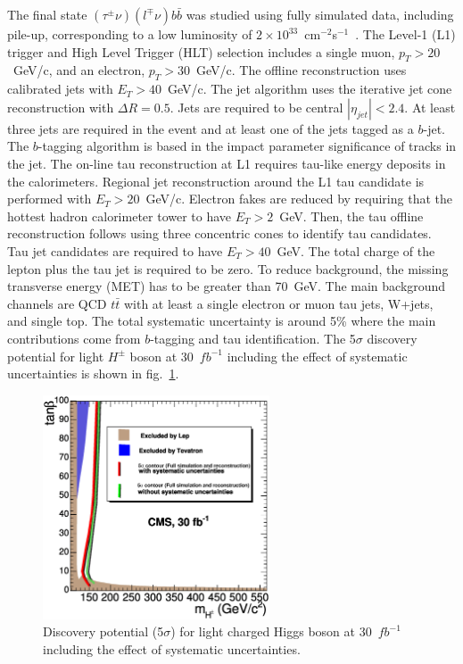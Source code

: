 \documentclass{cimento}
\begin{document}
The final state $(\tau^{\pm}\nu)(l^{\mp}\nu)b\bar{b}$ was studied using fully
simulated data, including pile-up, corresponding to a low luminosity of 
$2\times10^{33}$~cm$^{-2}$s$^{-1}$~\cite{ref:tauLepAna}. The Level-1 (L1) trigger and High Level Trigger (HLT) selection
includes a single muon, $p_{T}>20$~GeV/c, and an electron, $p_{T}>30$~GeV/c.
The offline reconstruction uses calibrated jets with $E_{T}>40$~GeV/c. The jet
algorithm uses the iterative jet cone reconstruction with $\Delta R=0.5$.
Jets are required to be central $| \eta_{jet}|<2.4$. At least three jets are
required in the event and at least one of the jets tagged as a $b$-jet. The 
$b$-tagging algorithm is based in the impact parameter significance of tracks in the jet.
The on-line tau reconstruction at L1 requires tau-like energy deposits 
in the calorimeters. Regional jet reconstruction around the L1 tau candidate
is performed with $E_{T}>20$~GeV/c. Electron fakes are reduced by requiring
that the hottest hadron calorimeter tower to have $E_{T}>2$~GeV. Then, the tau offline
reconstruction follows using three concentric cones to identify tau candidates.
Tau jet candidates are required to have $E_{T}>40$~GeV. The total charge of the
lepton plus the tau jet is required to be zero. To reduce background,
the missing transverse energy (MET) has to be greater than 70~GeV. The main 
background channels are QCD $t\bar{t}$ with at least a single electron or muon
tau jets, W+jets, and single top. The total systematic uncertainty is 
around 5\% where the main contributions come from $b$-tagging and tau identification.
The 5$\sigma$ discovery potential for light $H^{\pm}$ boson at 30~$fb^{-1}$
including the effect of systematic uncertainties is shown in fig.~\ref{fig:fig2}.


\begin{figure}
\centering
\includegraphics[width=0.6\textwidth]{fig02.ps}

\caption{Discovery potential (5$\sigma$) for light charged Higgs boson at
30~$fb^{-1}$ including the effect of systematic uncertainties.}
\label{fig:fig2}
\end{figure}
\end{document}
